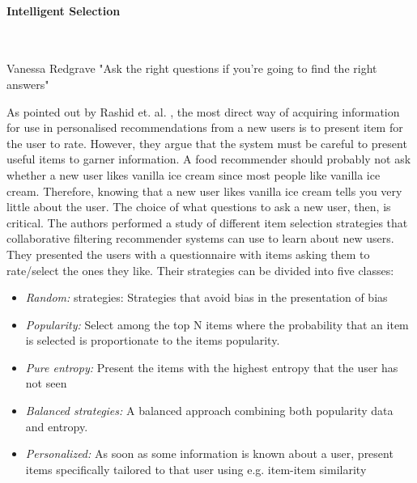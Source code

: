 
\paragraph{Intelligent Selection}\mbox{}\\


\begin{chapquote}[30pt]{Vanessa Redgrave}
  "Ask the right questions if you're going to find the right answers"
\end{chapquote}

As pointed out by Rashid et. al. \cite{Rashid2002}, the most direct way of acquiring information for use in personalised recommendations from a new users is to present item for the user to rate. However, they argue that the system must be careful to present useful items to garner information. A food recommender should probably not ask whether a new user likes vanilla ice cream since most people like vanilla ice cream. Therefore, knowing that a new user likes vanilla ice cream tells you very little about the user. The choice of what questions to ask a new user, then, is critical. The authors performed a study of different item selection strategies that collaborative filtering recommender systems can use to learn about new users. They presented the users with a questionnaire with items asking them to rate/select the ones they like. Their strategies can be divided into five classes:

\begin{itemize}
\item \emph{Random:} strategies: Strategies that avoid bias in the presentation of bias
\item \emph{Popularity:} Select among the top N items where the probability that an item is selected is proportionate to the items popularity.
\item \emph{Pure entropy:} Present the items with the highest entropy that the user has not seen
\item \emph{Balanced strategies:} A balanced approach combining both popularity data and entropy.
\item \emph{Personalized:} As soon as some information is known about a user, present items specifically tailored to that user using e.g. item-item similarity
\end{itemize}

